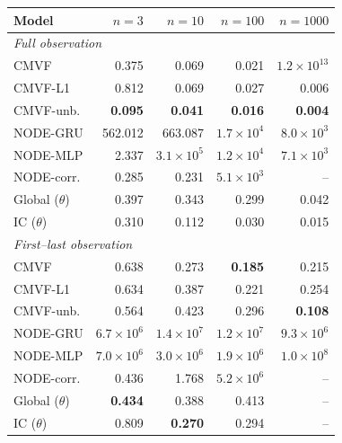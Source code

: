 \begin{tabular}{lrrrr}
\toprule
Model & $n{=}3$ & $n{=}10$ & $n{=}100$ & $n{=}1000$ \\
\midrule
\multicolumn{5}{l}{\emph{Full observation}} \\
CMVF & 0.375 & 0.069 & 0.021 & $1.2\!\times\!10^{13}$ \\
CMVF-L1 & 0.812 & 0.069 & 0.027 & 0.006 \\
CMVF-unb. & \textbf{0.095} & \textbf{0.041} & \textbf{0.016} & \textbf{0.004} \\
NODE-GRU & 562.012 & 663.087 & $1.7\!\times\!10^{4}$ & $8.0\!\times\!10^{3}$ \\
NODE-MLP & 2.337 & $3.1\!\times\!10^{5}$ & $1.2\!\times\!10^{4}$ & $7.1\!\times\!10^{3}$ \\
NODE-corr. & 0.285 & 0.231 & $5.1\!\times\!10^{3}$ & -- \\
Global ($\theta$) & 0.397 & 0.343 & 0.299 & 0.042 \\
IC ($\theta$) & 0.310 & 0.112 & 0.030 & 0.015 \\
\midrule
\multicolumn{5}{l}{\emph{First--last observation}} \\
CMVF & 0.638 & 0.273 & \textbf{0.185} & 0.215 \\
CMVF-L1 & 0.634 & 0.387 & 0.221 & 0.254 \\
CMVF-unb. & 0.564 & 0.423 & 0.296 & \textbf{0.108} \\
NODE-GRU & $6.7\!\times\!10^{6}$ & $1.4\!\times\!10^{7}$ & $1.2\!\times\!10^{7}$ & $9.3\!\times\!10^{6}$ \\
NODE-MLP & $7.0\!\times\!10^{6}$ & $3.0\!\times\!10^{6}$ & $1.9\!\times\!10^{6}$ & $1.0\!\times\!10^{8}$ \\
NODE-corr. & 0.436 & 1.768 & $5.2\!\times\!10^{6}$ & -- \\
Global ($\theta$) & \textbf{0.434} & 0.388 & 0.413 & -- \\
IC ($\theta$) & 0.809 & \textbf{0.270} & 0.294 & -- \\
\bottomrule
\end{tabular}
